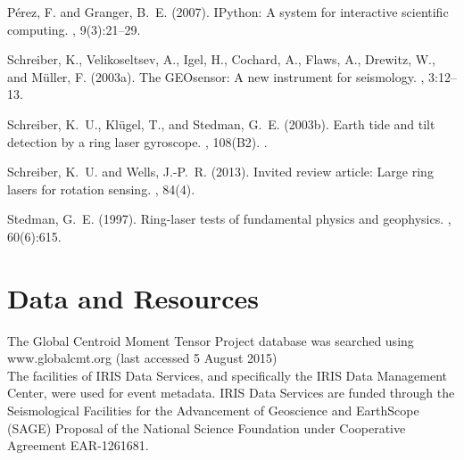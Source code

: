 \documentclass[12pt,reqno,letter]{article}
\begin{document}
\begin{thebibliography}{}
Pérez, F. and Granger, B.~E. (2007).
\newblock I{P}ython: A system for interactive scientific computing.
, 9(3):21--29.

Schreiber, K., Velikoseltsev, A., Igel, H., Cochard, A., Flaws, A., Drewitz,
  W., and M{\"u}ller, F. (2003a).
\newblock The {GEO}sensor: A new instrument for seismology.
, 3:12--13.

Schreiber, K.~U., Klügel, T., and Stedman, G.~E. (2003b).
\newblock Earth tide and tilt detection by a ring laser gyroscope.
, 108(B2).
.

Schreiber, K.~U. and Wells, J.-P.~R. (2013).
\newblock Invited review article: Large ring lasers for rotation sensing.
, 84(4).

Stedman, G.~E. (1997).
\newblock Ring-laser tests of fundamental physics and geophysics.
, 60(6):615.

\end{thebibliography}


\newpage

\section*{Data and Resources}
The Global Centroid Moment Tensor Project database was searched using www.globalcmt.org (last accessed 5 August 2015)\\

\noindent
The facilities of IRIS Data Services, and specifically the IRIS Data Management Center, were used for event metadata. IRIS Data Services are funded through the Seismological Facilities for the Advancement of Geoscience and EarthScope (SAGE) Proposal of the National Science Foundation under Cooperative Agreement EAR-1261681.

\noindent
\end{document}
